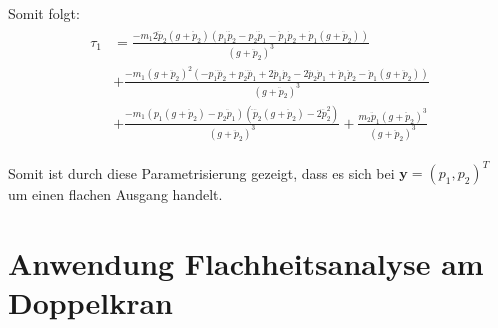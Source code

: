 Somit folgt:
\begin{align}
	\begin{split}
	\tau_1 &=
	\frac{- m_{1} 2 \dddot{p}_{2} \left(g + \ddot{p}_{2}\right) \left(p_{1} \dddot{p}_{2} - p_{2} \dddot{p}_{1} - \ddot{p}_{1} \dot{p}_{2} + \dot{p}_{1} \left(g + \ddot{p}_{2}\right)\right)}{\left(g + \ddot{p}_{2}\right)^{3}} \\	
	&+ \frac{- m_{1} \left(g + \ddot{p}_{2}\right)^{2} \left(- p_{1} \ddddot{p}_{2} + p_{2} \ddddot{p}_{1} + 2 \dddot{p}_{1} \dot{p}_{2} - 2 \dddot{p}_{2} \dot{p}_{1} + \ddot{p}_{1} \ddot{p}_{2} - \ddot{p}_{1} \left(g + \ddot{p}_{2}\right)\right)}{\left(g + \ddot{p}_{2}\right)^{3}} \\
	&+ \frac{-m_1 \left(p_{1} \left(g + \ddot{p}_{2}\right) - p_{2} \ddot{p}_{1}\right) \left(\ddddot{p}_{2} \left(g + \ddot{p}_{2}\right) - 2 \dddot{p}_{2}^{2}\right)}{\left(g + \ddot{p}_{2}\right)^{3}} + \frac{m_{2} \ddot{p}_{1} \left(g + \ddot{p}_{2}\right)^{3}}{\left(g + \ddot{p}_{2}\right)^{3}}
	\end{split}
\end{align}

Somit ist durch diese Parametrisierung gezeigt, dass es sich bei $\mathbf{y} = (p_1, p_2)^T$ um einen flachen Ausgang handelt.

\section{Anwendung Flachheitsanalyse am Doppelkran}

